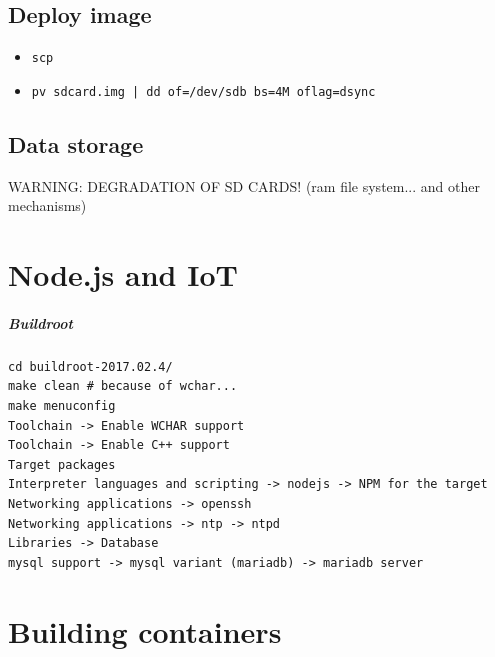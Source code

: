 \documentclass[printmode]{mgr}
\begin{document}
\section{Deploy image}

\begin{itemize}
  \item \verb|scp|
  \item \verb!pv sdcard.img | dd of=/dev/sdb bs=4M oflag=dsync!
\end{itemize}



\section{Data storage}
WARNING: DEGRADATION OF SD CARDS! (ram file system... and other mechanisms)




\chapter{Node.js and IoT}

\paragraph{Buildroot}

\begin{lstlisting}
cd buildroot-2017.02.4/
make clean # because of wchar...
make menuconfig
Toolchain -> Enable WCHAR support
Toolchain -> Enable C++ support
Target packages
Interpreter languages and scripting -> nodejs -> NPM for the target
Networking applications -> openssh
Networking applications -> ntp -> ntpd
Libraries -> Database
mysql support -> mysql variant (mariadb) -> mariadb server
\end{lstlisting}

\chapter{Building containers}

\end{document}
